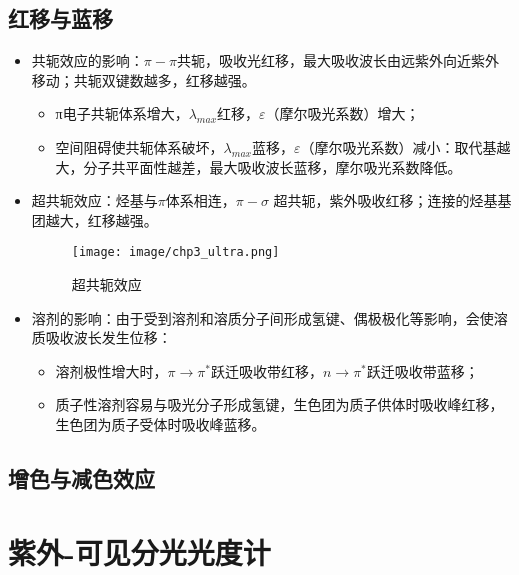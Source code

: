 \subsection{红移与蓝移}
\begin{itemize}
    \item 共轭效应的影响：$\pi -\pi$共轭，吸收光红移，最大吸收波长由远紫外向近紫外移动；共轭双键数越多，红移越强。
    \begin{itemize}
        \item  π电子共轭体系增大，$\lambda_{max}$红移，$\varepsilon$（摩尔吸光系数）增大；
        \item 空间阻碍使共轭体系破坏，$\lambda_{max}$蓝移，$\varepsilon$（摩尔吸光系数）减小：取代基越大，分子共平面性越差，最大吸收波长蓝移，摩尔吸光系数降低。
    \end{itemize}
    \item 超共轭效应：烃基与$\pi$体系相连，$\pi-\sigma$ 超共轭，紫外吸收红移；连接的烃基基团越大，红移越强。
    \begin{figure}[h]
        \centering
        \texttt{[image: image/chp3\_ultra.png]}
        \label{fig:chp3ultra}
        \caption{超共轭效应}
    \end{figure}
    \item 溶剂的影响：由于受到溶剂和溶质分子间形成氢键、偶极极化等影响，会使溶质吸收波长发生位移：
    \begin{itemize}
        \item 溶剂极性增大时，$\pi \rightarrow \pi^{*}$跃迁吸收带红移，$n\rightarrow \pi^{*}$跃迁吸收带蓝移；
        \item 质子性溶剂容易与吸光分子形成氢键，生色团为质子供体时吸收峰红移，生色团为质子受体时吸收峰蓝移。
    \end{itemize}
\end{itemize}

\subsection{增色与减色效应}

\section{紫外-可见分光光度计}

